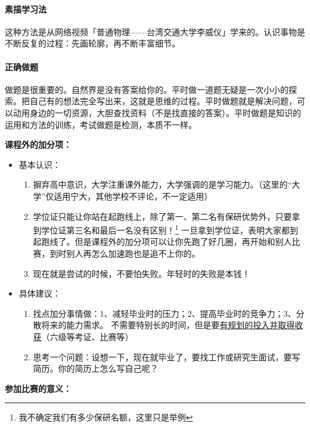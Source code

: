 \paragraph{素描学习法}
这种方法是从网络视频「普通物理——台湾交通大学李威仪」学来的。认识事物是不断反复的过程：先画轮廓，再不断丰富细节。

\paragraph{正确做题}
做题是很重要的。自然界是没有答案给你的。平时做一道题无疑是一次小小的探索。把自己有的想法完全写出来，这就是思维的过程。平时做题就是解决问题，可以动用身边的一切资源，大胆查找资料（不是找直接的答案）。平时做题是知识的运用和方法的训练，考试做题是检测，本质不一样。


{\bf 课程外的加分项：}
\begin{itemize}
\item 基本认识：
\begin{enumerate}
\item 摒弃高中意识，大学注重课外能力，大学强调的是学习能力。（这里的“大学”仅适用宁大，其他学校不评论，不一定适用）

\item 学位证只能让你站在起跑线上，除了第一、第二名有保研优势外，只要拿到学位证第三名和最后一名没有区别！\footnote{我不确定我们有多少保研名额，这里只是举例} 一旦拿到学位证，表明大家都到起跑线了。但是课程外的加分项可以让你先跑了好几圈，再开始和别人比赛，到时别人再怎么加速跑也是追不上你的。

\item 现在就是尝试的时候，不要怕失败。年轻时的失败是本钱！
\end{enumerate}

\item 具体建议：
\begin{enumerate}
\item 找点加分事情做：1、减轻毕业时的压力；2、提高毕业时的竞争力；3、分散将来的能力需求。
不需要特别长的时间，但是要\underline{有规划的投入并取得收获}（六级等考证、比赛等）

\item 思考一个问题：设想一下，现在就毕业了，要找工作或研究生面试，要写简历。你的简历上怎么写自己呢？
\end{enumerate}
\end{itemize}


{\bf 参加比赛的意义：}

